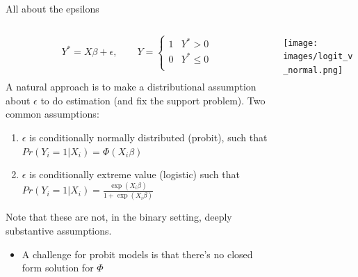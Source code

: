 \documentclass[notes,11pt, aspectratio=169]{beamer}
\newenvironment{wideitemize}{\itemize\addtolength{\itemsep}{10pt}}{\enditemize}
\begin{document}
\begin{frame}{All about the epsilons}
  \begin{columns}[T] %
    \begin{column}{.6\textwidth}
  $$Y^{*} = X\beta + \epsilon, \qquad Y = 
  \begin{cases}
    1 & Y^{*}>0\\
    0 & Y^{*} \leq 0\\
  \end{cases}
  $$
      \begin{wideitemize}
      \item A natural approach is to make a distributional assumption
        about $\epsilon$ to do estimation (and fix the support
        problem). Two common assumptions:
        \begin{enumerate}
        \item $\epsilon$ is conditionally normally distributed (probit), such that
          $Pr(Y_{i} = 1 | X_{i}) = \Phi(X_{i}\beta)$
        \item $\epsilon$ is conditionally extreme value (logistic) such that
          $Pr(Y_{i} = 1 | X_{i}) = \frac{\exp(X_{i}\beta)}{1+\exp(X_{i}\beta)}$
        \end{enumerate}
      \item   Note that these are not, in the binary setting, deeply substantive
        assumptions.
        \begin{itemize}
        \item A challenge for probit models is that there's no closed
          form solution for $\Phi$
        \end{itemize}
      \end{wideitemize}
    \end{column}%
  \hfill%
  \begin{column}{.4\textwidth}
    \begin{center}
      \texttt{[image: images/logit\_v\_normal.png]}
    \end{center}
  \end{column}
\end{columns}
  \end{frame}
\end{document}

